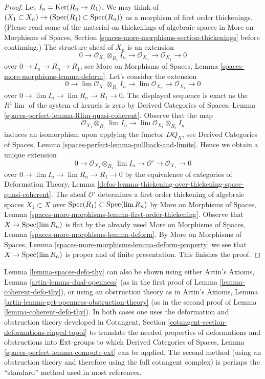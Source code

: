 \begin{proof}
\medskip\noindent
Let $I_n = \mathop{\mathrm{Ker}}(R_n \to R_1)$. We may think of
$(X_1 \subset X_n) \to (\mathop{\mathrm{Spec}}(R_1) \subset \mathop{\mathrm{Spec}}(R_n))$
as a morphism of first order thickenings. (Please read some of the material
on thickenings of algebraic spaces in More on Morphisms of Spaces, Section
\ref{spaces-more-morphisms-section-thickenings}
before continuing.) The structure sheaf of $X_n$ is an extension
$$
0 \to \mathcal{O}_{X_1} \otimes_{R_1} I_n \to
\mathcal{O}_{X_n} \to \mathcal{O}_{X_1} \to 0
$$
over $0 \to I_n \to R_n \to R_1$, see
More on Morphisms of Spaces, Lemma
\ref{spaces-more-morphisms-lemma-deform}.
Let's consider the extension
$$
0 \to \lim \mathcal{O}_{X_1} \otimes_{R_1} I_n \to
\lim \mathcal{O}_{X_n} \to \mathcal{O}_{X_1} \to 0
$$
over $0 \to \lim I_n \to \lim R_n \to R_1 \to 0$.
The displayed sequence is exact as the $R^1\lim$ of the system
of kernels is zero by Derived Categories of Spaces, Lemma
\ref{spaces-perfect-lemma-Rlim-quasi-coherent}.
Observe that the map
$$
\mathcal{O}_{X_1} \otimes_{R_1} \lim I_n \longrightarrow
\lim \mathcal{O}_{X_1} \otimes_{R_1} I_n
$$
induces an isomorphism upon applying the functor $DQ_X$, see
Derived Categories of Spaces, Lemma
\ref{spaces-perfect-lemma-pullback-and-limits}.
Hence we obtain a unique extension
$$
0 \to \mathcal{O}_{X_1} \otimes_{R_1} \lim I_n \to
\mathcal{O}' \to \mathcal{O}_{X_1} \to 0
$$
over $0 \to \lim I_n \to \lim R_n \to R_1 \to 0$
by the equivalence of categories of
Deformation Theory, Lemma
\ref{defos-lemma-thickening-over-thickening-space-quasi-coherent}.
The sheaf $\mathcal{O}'$ determines
a first order thickening of algebraic spaces $X_1 \subset X$
over $\mathop{\mathrm{Spec}}(R_1) \subset \mathop{\mathrm{Spec}}(\mathop{\mathrm{lim}}\nolimits R_n)$
by More on Morphisms of Spaces, Lemma
\ref{spaces-more-morphisms-lemma-first-order-thickening}.
Observe that $X \to \mathop{\mathrm{Spec}}(\mathop{\mathrm{lim}}\nolimits R_n)$ is flat by the already
used More on Morphisms of Spaces, Lemma
\ref{spaces-more-morphisms-lemma-deform}.
By More on Morphisms of Spaces, Lemma
\ref{spaces-more-morphisms-lemma-deform-property}
we see that $X \to \mathop{\mathrm{Spec}}(\mathop{\mathrm{lim}}\nolimits R_n)$ is proper
and of finite presentation.
This finishes the proof.
\end{proof}

\begin{remark}
\label{remark-spaces-defo-thy}
Lemma \ref{lemma-spaces-defo-thy} can also be shown using either
Artin's Axioms, Lemma \ref{artin-lemma-dual-openness}
(as in the first proof of
Lemma \ref{lemma-coherent-defo-thy}), or using an obstruction theory
as in Artin's Axioms, Lemma \ref{artin-lemma-get-openness-obstruction-theory}
(as in the second proof of
Lemma \ref{lemma-coherent-defo-thy}).
In both cases one uses the deformation and obstruction theory developed in
Cotangent, Section \ref{cotangent-section-deformations-ringed-topoi}
to translate the needed properties of deformations and obstructions
into $\mathop{\mathrm{Ext}}\nolimits$-groups to which
Derived Categories of Spaces, Lemma
\ref{spaces-perfect-lemma-compute-ext}
can be applied.
The second method (using an obstruction theory and therefore
using the full cotangent complex) is perhaps the ``standard'' method used
in most references.
\end{remark}





